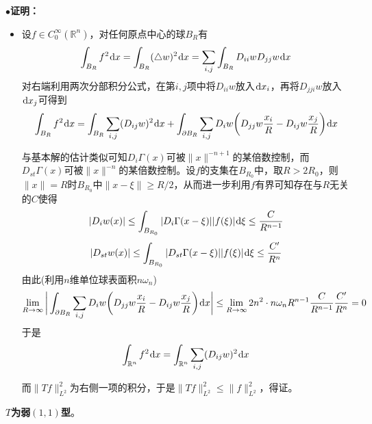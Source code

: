 \documentclass[a4paper,UTF8,fontset=windows,AutoFakeBold]{ctexart}
\newcommand*{\dr}{\hspace{0.07em}\mathrm{d}}
\newcommand{\proo}[1]{{\kaishu $\bullet$\textbf{证明：}
\begin{itemize}
    \item[] #1
\end{itemize}
}}
\begin{document}
\proo{
    设$f\in C_0^\infty(\mathbb{R}^n)$，对任何原点中心的球$B_R$有
    $$\int_{B_R}f^2\dr x=\int_{B_R}(\triangle w)^2\dr x=\sum_{i,j}\int_{B_R}D_{ii}wD_{jj}w\dr x$$
    对右端利用两次分部积分公式，在第$i,j$项中将$D_{ii}w$放入$\dr x_i$，再将$D_{jji}w$放入$\dr x_j$可得到
    $$\int_{B_R}f^2\dr x=\int_{B_R}\sum_{i,j}(D_{ij}w)^2\dr x+\int_{\partial B_R}\sum_{i,j}D_iw\bigg(D_{jj}w\frac{x_i}{R}-D_{ij}w\frac{x_j}{R}\bigg)\dr x$$

    与基本解的估计类似可知$D_i\Gamma(x)$可被$\|x\|^{-n+1}$的某倍数控制，而$D_{st}\Gamma(x)$可被$\|x\|^{-n}$的某倍数控制。设$f$的支集在$B_{R_0}$中，取$R>2R_0$，则$\|x\|=R$时$B_{R_0}$中$\|x-\xi\|\ge R/2$，从而进一步利用$f$有界可知存在与$R$无关的$C$使得
    $$|D_iw(x)|\le\int_{B_{R_0}}|D_i\Gamma(x-\xi)||f(\xi)|\dr\xi\le\frac{C}{R^{n-1}}$$
    $$|D_{st}w(x)|\le\int_{B_{R_0}}|D_{st}\Gamma(x-\xi)||f(\xi)|\dr\xi\le\frac{C'}{R^n}$$
    由此(利用$n$维单位球表面积$n\omega_n$)
    $$\lim_{R\to\infty}\bigg|\int_{\partial B_R}\sum_{i,j}D_iw\bigg(D_{jj}w\frac{x_i}{R}-D_{ij}w\frac{x_j}{R}\bigg)\dr x\bigg|\le\lim_{R\to\infty}2n^2\cdot n\omega_nR^{n-1}\frac{C}{R^{n-1}}\frac{C'}{R^n}=0$$
    于是
    $$\int_{\mathbb{R}^n}f^2\dr x=\int_{\mathbb{R}^n}\sum_{i,j}(D_{ij}w)^2\dr x$$
    
    而$\|Tf\|_{L^2}^2$为右侧一项的积分，于是$\|Tf\|_{L^2}^2\le\|f\|_{L^2}^2$，得证。
}

\textbf{$T$为弱$(1,1)$型}。
\end{document}
